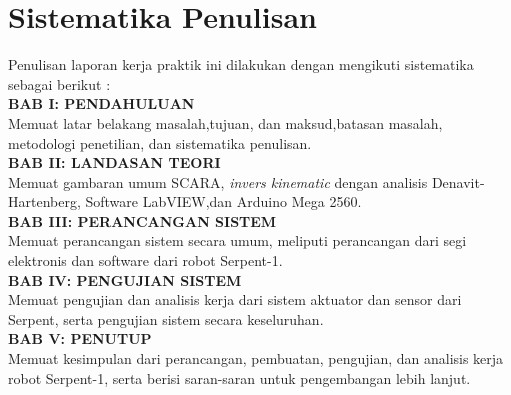 \section{Sistematika Penulisan}
Penulisan laporan kerja praktik ini dilakukan dengan mengikuti sistematika sebagai berikut :\\
\noindent
\textbf{BAB I\hspace*{0.6cm}: PENDAHULUAN}\\
\noindent
Memuat latar belakang masalah,tujuan, dan maksud,batasan masalah, metodologi penetilian, dan sistematika penulisan.\\
\noindent
\textbf{BAB II\hspace*{0.5cm}: LANDASAN TEORI}\\
\noindent
Memuat gambaran umum SCARA, \textit{invers kinematic} dengan analisis Denavit-Hartenberg, Software LabVIEW,dan Arduino Mega 2560.\\
\textbf{BAB III\hspace*{0.375cm}:  PERANCANGAN SISTEM}\\
\noindent
Memuat perancangan sistem secara umum, meliputi perancangan dari segi elektronis dan software dari robot Serpent-1.\\
\textbf{BAB IV\hspace*{0.4cm}: PENGUJIAN SISTEM}\\
\noindent
Memuat pengujian dan analisis kerja dari sistem aktuator dan sensor dari Serpent, serta pengujian sistem secara keseluruhan.\\
\textbf{BAB V\hspace*{0.6cm}: PENUTUP}\\
Memuat kesimpulan dari perancangan, pembuatan, pengujian, dan analisis kerja robot Serpent-1, serta berisi saran-saran untuk pengembangan lebih lanjut.\\